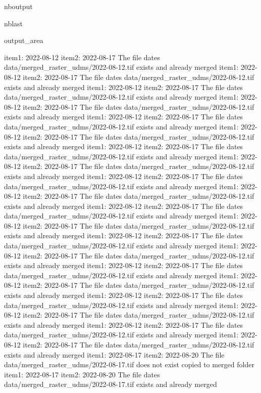 \documentclass[letterpaper,10pt]{sphinxmanual}
\begin{document}
\begin{sphinxuseclass}{nboutput}
\begin{sphinxuseclass}{nblast}
{\begin{sphinxuseclass}{output_area}
\begin{sphinxuseclass}{}
\begin{sphinxVerbatim}[commandchars=\\\{\}]
item1:  2022-08-12
item2:  2022-08-17
The file dates data/merged\_raster\_udms/2022-08-12.tif exists and already merged
item1:  2022-08-12
item2:  2022-08-17
The file dates data/merged\_raster\_udms/2022-08-12.tif exists and already merged
item1:  2022-08-12
item2:  2022-08-17
The file dates data/merged\_raster\_udms/2022-08-12.tif exists and already merged
item1:  2022-08-12
item2:  2022-08-17
The file dates data/merged\_raster\_udms/2022-08-12.tif exists and already merged
item1:  2022-08-12
item2:  2022-08-17
The file dates data/merged\_raster\_udms/2022-08-12.tif exists and already merged
item1:  2022-08-12
item2:  2022-08-17
The file dates data/merged\_raster\_udms/2022-08-12.tif exists and already merged
item1:  2022-08-12
item2:  2022-08-17
The file dates data/merged\_raster\_udms/2022-08-12.tif exists and already merged
item1:  2022-08-12
item2:  2022-08-17
The file dates data/merged\_raster\_udms/2022-08-12.tif exists and already merged
item1:  2022-08-12
item2:  2022-08-17
The file dates data/merged\_raster\_udms/2022-08-12.tif exists and already merged
item1:  2022-08-12
item2:  2022-08-17
The file dates data/merged\_raster\_udms/2022-08-12.tif exists and already merged
item1:  2022-08-12
item2:  2022-08-17
The file dates data/merged\_raster\_udms/2022-08-12.tif exists and already merged
item1:  2022-08-12
item2:  2022-08-17
The file dates data/merged\_raster\_udms/2022-08-12.tif exists and already merged
item1:  2022-08-12
item2:  2022-08-17
The file dates data/merged\_raster\_udms/2022-08-12.tif exists and already merged
item1:  2022-08-12
item2:  2022-08-17
The file dates data/merged\_raster\_udms/2022-08-12.tif exists and already merged
item1:  2022-08-12
item2:  2022-08-17
The file dates data/merged\_raster\_udms/2022-08-12.tif exists and already merged
item1:  2022-08-12
item2:  2022-08-17
The file dates data/merged\_raster\_udms/2022-08-12.tif exists and already merged
item1:  2022-08-12
item2:  2022-08-17
The file dates data/merged\_raster\_udms/2022-08-12.tif exists and already merged
item1:  2022-08-12
item2:  2022-08-17
The file dates data/merged\_raster\_udms/2022-08-12.tif exists and already merged
item1:  2022-08-12
item2:  2022-08-17
The file dates data/merged\_raster\_udms/2022-08-12.tif exists and already merged
item1:  2022-08-12
item2:  2022-08-17
The file dates data/merged\_raster\_udms/2022-08-12.tif exists and already merged
item1:  2022-08-17
item2:  2022-08-20
The file data/merged\_raster\_udms/2022-08-17.tif does not exist copied to merged folder
item1:  2022-08-17
item2:  2022-08-20
The file dates data/merged\_raster\_udms/2022-08-17.tif exists and already merged

\end{sphinxVerbatim}
\end{sphinxuseclass}
\end{sphinxuseclass}}
\end{sphinxuseclass}
\end{sphinxuseclass}
\end{document}
